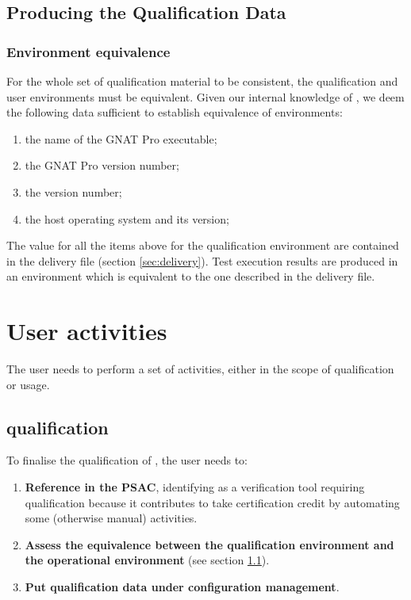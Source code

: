 \documentclass {report}
\begin{document}
\section{Producing the Qualification Data}

\subsection{Environment equivalence}
\label{sec:equivalence}

For the whole set of qualification material to be consistent, the
qualification and user environments must be equivalent. Given our internal
knowledge of \xcov{}, we deem the following data sufficient to establish
equivalence of environments:

\begin{enumerate}
\item the name of the GNAT Pro executable;
\item the GNAT Pro version number;
\item the \xcov{} version number;
\item the host operating system and its version;
\end{enumerate}

The value for all the items above for the qualification environment are
contained in the delivery file (section \ref{sec:delivery}). Test execution
results are produced in an environment which is equivalent to the one
described in the delivery file.

\chapter{User activities}
\label{sec:user-act}
The user needs to perform a set of activities, either in the scope of \xcov{} qualification or \xcov{} usage.

\section{\xcov{} qualification}
To finalise the qualification of \xcov{}, the user needs to:
\begin{enumerate}
\item \textbf{Reference \xcov{} in the PSAC}, identifying \xcov{} as a verification tool requiring qualification because it contributes to take certification credit by automating some (otherwise manual) activities.
\item \textbf{Assess the equivalence between the qualification environment and the operational environment} (see section \ref{sec:equivalence}).
\item \textbf{Put qualification data under configuration management}.
\end{enumerate}
\end{document}
